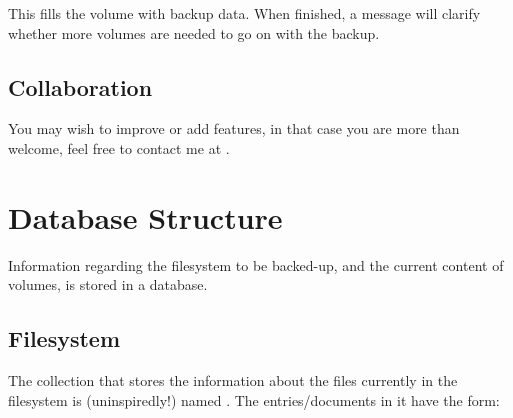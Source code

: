\documentclass[letterpaper,10pt,english]{sphinxmanual}
\begin{document}
This fills the volume with backup data. When finished, a message will clarify whether more volumes are needed to go on
with the backup.


\section{Collaboration}
\label{\detokenize{index:collaboration}}
You may wish to improve or add features, in that case you are more than welcome, feel free to contact me at .


\chapter{Database Structure}
\label{\detokenize{index:database-structure}}
Information regarding the filesystem to be backed-up, and the current content
of volumes, is stored in a  database.


\section{Filesystem}
\label{\detokenize{index:filesystem}}
The collection that stores the information about the files currently in the filesystem is (uninspiredly!) named .
The entries/documents in it have the form:

\begin{sphinxVerbatim}[commandchars=\\\{\}]
 
 
 
 
 
\end{sphinxVerbatim}
\end{document}
